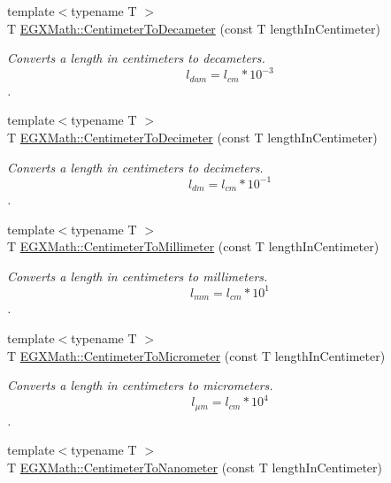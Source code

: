 \begin{DoxyCompactItemize}
{\footnotesize template$<$typename T $>$ }\\T \mbox{\hyperlink{group___e_g_x_math-_conversions-_length_conversions-_s_i-_centimeter-_s_i_ga5f40a749a8759a89e5c618df3c3b7945}{E\+G\+X\+Math\+::\+Centimeter\+To\+Decameter}} (const T length\+In\+Centimeter)
\begin{DoxyCompactList}\small\item\em Converts a length in centimeters to decameters. \[ l_{dam}=l_{cm} * 10^{-3} \]. \end{DoxyCompactList}\item 
{\footnotesize template$<$typename T $>$ }\\T \mbox{\hyperlink{group___e_g_x_math-_conversions-_length_conversions-_s_i-_centimeter-_s_i_gae1263088b67f23124cc7770d66fbb38b}{E\+G\+X\+Math\+::\+Centimeter\+To\+Decimeter}} (const T length\+In\+Centimeter)
\begin{DoxyCompactList}\small\item\em Converts a length in centimeters to decimeters. \[ l_{dm}=l_{cm} * 10^{-1} \]. \end{DoxyCompactList}\item 
{\footnotesize template$<$typename T $>$ }\\T \mbox{\hyperlink{group___e_g_x_math-_conversions-_length_conversions-_s_i-_centimeter-_s_i_ga3adaa50da05ec6ead83e93dbd9406ae0}{E\+G\+X\+Math\+::\+Centimeter\+To\+Millimeter}} (const T length\+In\+Centimeter)
\begin{DoxyCompactList}\small\item\em Converts a length in centimeters to millimeters. \[ l_{mm}=l_{cm} * 10^{1} \]. \end{DoxyCompactList}\item 
{\footnotesize template$<$typename T $>$ }\\T \mbox{\hyperlink{group___e_g_x_math-_conversions-_length_conversions-_s_i-_centimeter-_s_i_gaa05fd2c1b2c9ab2ac8aa7f1ef8be612a}{E\+G\+X\+Math\+::\+Centimeter\+To\+Micrometer}} (const T length\+In\+Centimeter)
\begin{DoxyCompactList}\small\item\em Converts a length in centimeters to micrometers. \[ l_{\mu m}=l_{cm} * 10^{4} \]. \end{DoxyCompactList}\item 
{\footnotesize template$<$typename T $>$ }\\T \mbox{\hyperlink{group___e_g_x_math-_conversions-_length_conversions-_s_i-_centimeter-_s_i_gacf80778df778af3266027dbe32bfd2d4}{E\+G\+X\+Math\+::\+Centimeter\+To\+Nanometer}} (const T length\+In\+Centimeter)

\end{DoxyCompactItemize}
